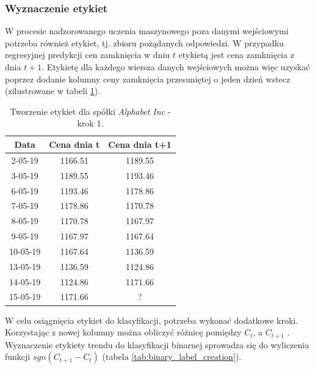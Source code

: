 \documentclass[a4paper, twoside, 11pt, openright]{article}
\begin{document}
\subsubsection{Wyznaczenie etykiet}

W procesie nadzorowanego uczenia maszynowego poza danymi wejściowymi potrzeba również etykiet, tj. zbioru pożądanych odpowiedzi. W przypadku regresyjnej predykcji cen zamknięcia w dniu $t$ etykietą jest cena zamknięcia z dnia $t+1$. Etykietę dla każdego wiersza danych wejściowych można więc uzyskać poprzez dodanie kolumny ceny zamknięcia przesuniętej o jeden dzień wstecz (zilustrowane w tabeli \ref{tab:regression_label_creation}). 

 \begin{table}[H]
    \centering
    \begin{tabular}{|c|c|c|}
    \hline
        \textbf{Data}  & \textbf{Cena dnia t} & \textbf{Cena dnia t+1}\\ \hline
            2-05-19 & 1166.51 & 1189.55 \\ \hline
            3-05-19 & 1189.55 & 1193.46 \\ \hline 
            6-05-19 & 1193.46 & 1178.86 \\ \hline 
            7-05-19 & 1178.86 & 1170.78 \\ \hline 
            8-05-19 & 1170.78 & 1167.97 \\ \hline 
            9-05-19 & 1167.97 & 1167.64 \\ \hline 
            10-05-19 & 1167.64 & 1136.59 \\ \hline 
            13-05-19 & 1136.59 & 1124.86 \\ \hline 
            14-05-19 & 1124.86 & 1171.66 \\ \hline 
            15-05-19 & 1171.66 & ? \\ \hline 
    \end{tabular}
    \caption{Tworzenie etykiet dla spółki \textit{Alphabet Inc} - krok 1.}
    \label{tab:regression_label_creation}
\end{table} 

W celu osiągnięcia etykiet do klasyfikacji, potrzeba wykonać dodatkowe kroki. Korzystając z nowej kolumny można obliczyć różnicę pomiędzy $C_t$, a $C_{t+1}$ . Wyznaczenie etykiety trendu do klasyfikacji binarnej sprowadza się do wyliczenia funkcji $sgn(C_{t+1}-C_{t})$ (tabela \ref{tab:binary_label_creation}). 
\end{document}
